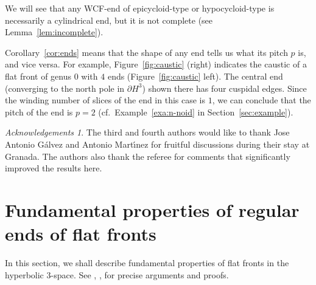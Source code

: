 \documentclass[a4paper]{amsart}
\theoremstyle{plain}
\theoremstyle{remark}
\newtheorem*{acknowledgement}{Acknowledgements}
\numberwithin{equation}{section}
\begin{document}
We will see that any WCF-end of epicycloid-type or hypocycloid-type is 
necessarily a cylindrical end, but it is not complete
(see Lemma~\ref{lem:incomplete}). 

Corollary~\ref{cor:ends} means that the shape of any end tells us what
its pitch $p$ is, and vice versa.  
For example, Figure~\ref{fig:caustic} (right) indicates the
caustic of a flat front of genus $0$ with $4$ ends 
(Figure~\ref{fig:caustic} left). 
The central end (converging to the north pole in $\partial H^3$) shown
there has four cuspidal edges.  
Since the winding number of slices of the end in this case is $1$, 
we can conclude that the pitch of the end is $p=2$ 
(cf.\ Example~\ref{exa:n-noid} in Section~\ref{sec:example}).
\begin{acknowledgement}
 The third and fourth authors would like to thank 
 Jose Antonio G\'alvez and 
 Antonio Mart\'\i{}nez for fruitful discussions 
 during their stay at Granada.
 The authors also thank  
 the referee for comments that significantly improved the results here.
\end{acknowledgement}
\endgroup
\section{Fundamental properties of regular ends of flat fronts}
\label{sec:prelim}
In this section, we shall describe fundamental properties of flat
fronts in the hyperbolic $3$-space.
See \cite{KUY1}, \cite{KUY2}, \cite{KRUY} for precise arguments 
and proofs.
\end{document}
